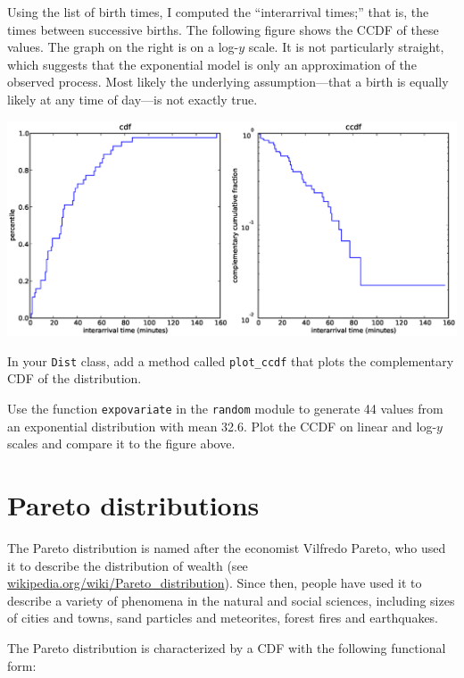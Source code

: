 \documentclass[10pt]{book}
\begin{document}
Using the list of birth times, I computed the ``interarrival times;''
that is, the times between successive births.  The following figure
shows the CCDF of these values.  The graph on the right is on a
log-$y$ scale.  It is not particularly straight, which suggests that
the exponential model is only an approximation of the observed
process.  Most likely the underlying assumption---that a birth is
equally likely at any time of day---is not exactly true.

\beforefig
\centerline{\includegraphics[width=5.5in]{figs/babyboom_cdf.eps}}
\afterfig

\begin{ex}
In your {\tt Dist} class, add
a method called \verb"plot_ccdf" that plots the complementary
CDF of the distribution.
\end{ex}

\begin{ex}
Use the function {\tt expovariate} in the {\tt random} module
to generate 44 values from an exponential distribution with
mean 32.6.  Plot the CCDF on linear and log-$y$ scales and compare
it to the figure above.  
\end{ex}


\section{Pareto distributions}

The Pareto distribution is named after the economist Vilfredo
Pareto, who used it to describe the distribution of wealth
(see \url{wikipedia.org/wiki/Pareto_distribution}).  Since then,
people have used it to describe
a variety of phenomena in the natural and social sciences,
including sizes of cities and towns, sand particles
and meteorites, forest fires and earthquakes.

The Pareto distribution is characterized by a CDF with the following
functional form:
\end{document}
